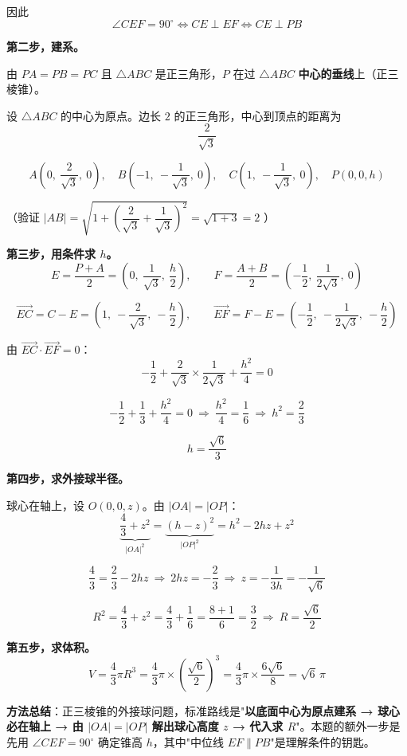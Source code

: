 因此
\[\angle CEF=90^\circ\iff CE\perp EF\iff CE\perp PB\]

\textbf{第二步，建系。}

由 $PA=PB=PC$ 且 $\triangle ABC$ 是正三角形，$P$ 在过 $\triangle ABC$ \textbf{中心的垂线}上（正三棱锥）。

设 $\triangle ABC$ 的中心为原点。边长 $2$ 的正三角形，中心到顶点的距离为
\[\frac{2}{\sqrt3}\]

\[A\left(0,\ \frac2{\sqrt3},\ 0\right),\quad B\left(-1,\ -\frac1{\sqrt3},\ 0\right),\quad C\left(1,\ -\frac1{\sqrt3},\ 0\right),\quad P(0,0,h)\]

（验证 $|AB|=\sqrt{1+\left(\dfrac2{\sqrt3}+\dfrac1{\sqrt3}\right)^{2}}=\sqrt{1+3}=2$ ）

\textbf{第三步，用条件求 $h$。}
\[E=\frac{P+A}2=\left(0,\ \frac1{\sqrt3},\ \frac h2\right),\qquad F=\frac{A+B}2=\left(-\frac12,\ \frac1{2\sqrt3},\ 0\right)\]

\[\overrightarrow{EC}=C-E=\left(1,\ -\frac2{\sqrt3},\ -\frac h2\right),\qquad \overrightarrow{EF}=F-E=\left(-\frac12,\ -\frac1{2\sqrt3},\ -\frac h2\right)\]

由 $\overrightarrow{EC}\cdot\overrightarrow{EF}=0$：
\[-\frac12+\frac2{\sqrt3}\times\frac1{2\sqrt3}+\frac{h^{2}}4=0\]

\[-\frac12+\frac13+\frac{h^{2}}4=0\ \Longrightarrow\ \frac{h^{2}}4=\frac16\ \Longrightarrow\ h^{2}=\frac23\]

\[h=\frac{\sqrt6}3\]

\textbf{第四步，求外接球半径。}

球心在轴上，设 $O(0,0,z)$。由 $|OA|=|OP|$：
\[\underbrace{\frac43+z^{2}}_{|OA|^{2}}=\underbrace{(h-z)^{2}}_{|OP|^{2}}=h^{2}-2hz+z^{2}\]

\[\frac43=\frac23-2hz\ \Longrightarrow\ 2hz=-\frac23\ \Longrightarrow\ z=-\frac1{3h}=-\frac1{\sqrt6}\]

\[R^{2}=\frac43+z^{2}=\frac43+\frac16=\frac{8+1}6=\frac32\ \Longrightarrow\ R=\frac{\sqrt6}2\]

\textbf{第五步，求体积。}
\[V=\frac43\pi R^{3}=\frac43\pi\times\left(\frac{\sqrt6}2\right)^{3}=\frac43\pi\times\frac{6\sqrt6}8=\sqrt6\,\pi\]


\begin{gktip}
\textbf{方法总结}：正三棱锥的外接球问题，标准路线是"\textbf{以底面中心为原点建系 → 球心必在轴上 → 由 $|OA|=|OP|$ 解出球心高度 $z$ → 代入求 $R$}"。本题的额外一步是先用 $\angle CEF=90^\circ$ 确定锥高 $h$，其中"中位线 $EF\parallel PB$"是理解条件的钥匙。
\end{gktip}

